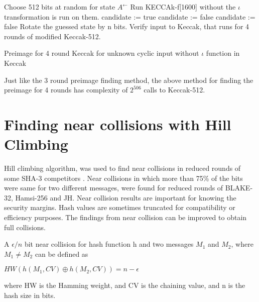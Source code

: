 \begin{algorithm}[H]
\begin{algorithmic}[1]
  \State Choose 512 bits at random for state $A^{\leftarrow}$
  \State Run KECCAk-f[1600] without the $\iota$ transformation is run on them.
    \State candidate := true
        \State candidate := false
      \EndIf
        \State candidate := false
      \EndIf
    \EndFor
      \State Rotate the guessed state by n bits.
      \State Verify input to Keccak, that runs for 4 rounds of modified Keccak-512.
    \EndIf
  \EndFor
\end{algorithmic}
\caption[Preimage for 4 round Keccak for unknown cyclic input without $\iota$ function in Keccak \cite{00022}]
{Preimage for 4 round Keccak for unknown cyclic input without $\iota$ function in Keccak \cite{00022}}
\label{alg:seq}
\end{algorithm}

Just like the 3 round preimage finding method, the above method for finding the preimage for 4 rounds has complexity of
$2^{506}$ calls to Keccak-512.

\section{Finding near collisions with Hill Climbing}

Hill climbing algorithm, was used to find near collisions in reduced rounds of some SHA-3 competitors \cite{00029}.
Near collisions in which more than 75\% of the bits were same for two different messages, were found 
for reduced rounds of BLAKE-32, Hamsi-256 and JH. Near collision results are important for knowing the security
margins. Hash values are sometimes truncated for compatibility or efficiency purposes. The findings from near collision
can be improved to obtain full collisions.

A $\epsilon / n $ bit near collision for hash function h and two messages $M_{1}$ and $M_{2}$, where $M_{1} \neq M_{2}$ can be 
defined as
\begin{center}$HW( h( M_{1}, CV ) \oplus h( M_{2}, CV ) ) = n - \epsilon $\end{center}
where HW is the Hamming weight, and CV is the chaining value, and n is the hash size in bits.

